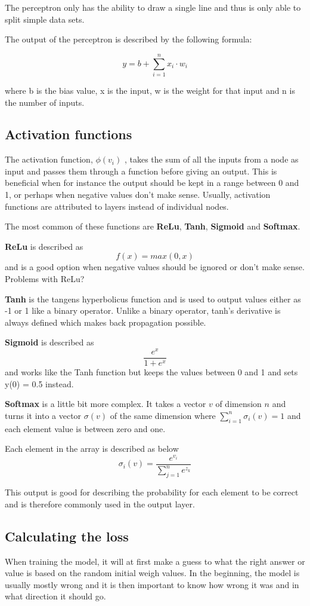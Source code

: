 The perceptron only has the ability to draw a single line and thus is only able to split simple data sets.

The output of the perceptron is described by the following formula:

\[ y = b + \displaystyle\sum_{i=1}^{n} x_i \cdot w_i \]

where b is the bias value, x is the input, w is the weight for that input and n is the number of inputs.

\subsection{Activation functions}

The activation function,  $ \phi (v_{i}) $ , takes the sum of all the inputs from a node as input and passes them through a function before giving an output. This is beneficial when for instance the output should be kept in a range between 0 and 1, or perhaps when negative values don't make sense.
Usually, activation functions are attributed to layers instead of individual nodes.

The most common of these functions are \textbf{ReLu}, \textbf{Tanh}, \textbf{Sigmoid} and \textbf{Softmax}.

\textbf{ReLu} is described as
\[f(x) = max(0, x)\]
and is a good option when negative values should be ignored or don't make sense. Problems with ReLu?

\textbf{Tanh} is the tangens hyperbolicus function and is used to output values either as -1 or 1 like a binary operator. Unlike a binary operator, tanh's derivative is always defined which makes back propagation possible.

\textbf{Sigmoid} is described as 
\[\frac{e^x}{1+e^x}\]
and works like the Tanh function but keeps the values between 0 and 1 and sets y(0) = 0.5 instead.

\textbf{Softmax} is a little bit more complex. It takes a vector $v$ of dimension $n$ and turns it into a vector $\sigma(v)$ of the same dimension where $\displaystyle\sum_{i=1}^{n} \sigma_i(v) = 1 $ and each element value is between zero and one.

Each element in the array is described as below
\[ \sigma_i(v) = \frac{e^{v_i}}{\displaystyle\sum_{j=1}^{n} e^{z_k}} \]

This output is good for describing the probability for each element to be correct and is therefore commonly used
in the output layer.

\subsection{Calculating the loss}
When training the model, it will at first make a guess to what the right answer or value is based on the random initial weigh values. In the beginning, the model is usually mostly wrong and it is then important to know how wrong it was and in what direction it should go.

